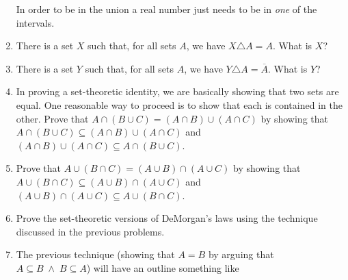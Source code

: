 \begin{enumerate}
{In order to be in the union a real number just needs to be in {\em one} of the intervals.
}

\wbvfill

\workbookpagebreak

\item There is a set $X$ such that, for all sets $A$, we have 
$X \triangle A = A$.  What is $X$?

\wbvfill

\item There is a set $Y$ such that, for all sets $A$, we have 
$Y \triangle A = \overline{A}$.  What is $Y$?


\wbvfill

\workbookpagebreak

\item In proving a set-theoretic identity, we are basically showing that
two sets are equal.  One reasonable way to proceed is to show that
each is contained in the other.  Prove that 
$A \cap (B \cup C) = (A \cap B) \cup (A \cap C)$ by showing that 
$A \cap (B \cup C) \subseteq (A \cap B) \cup (A \cap C)$ and 
$(A \cap B) \cup (A \cap C) \subseteq A \cap (B \cup C)$.

\wbvfill

\workbookpagebreak

\item Prove that 
$A \cup (B \cap C) = (A \cup B) \cap (A \cup C)$ by showing that 
$A \cup (B \cap C) \subseteq (A \cup B) \cap (A \cup C)$ and 
$(A \cup B) \cap (A \cup C) \subseteq A \cup (B \cap C)$.


 \wbvfill

\workbookpagebreak
 
\item Prove the set-theoretic versions of DeMorgan's laws using the technique
discussed in the previous problems.

\wbvfill

\workbookpagebreak

\item The previous technique (showing that $A=B$ by arguing that
$A \subseteq B \; \land \; B \subseteq A$) will have an outline something like


\end{enumerate}
